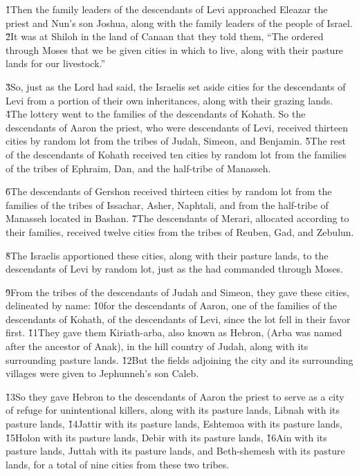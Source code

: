 \v{1}Then the family leaders of the descendants of Levi approached Eleazar the priest and Nun's son Joshua, along with the family leaders of the people of Israel. \v{2}It was at Shiloh in the land of Canaan that they told them, ``The  ordered through Moses that we be given cities in which to live, along with their pasture lands for our livestock.''

\v{3}So, just as the Lord had said, the Israelis set aside cities for the descendants of Levi from a portion of their own inheritances, along with their grazing lands. \v{4}The lottery went to the families of the descendants of Kohath. So the descendants of Aaron the priest, who were descendants of Levi, received thirteen cities by random lot from the tribes of Judah, Simeon, and Benjamin. \v{5}The rest of the descendants of Kohath received ten cities by random lot from the families of the tribes of Ephraim, Dan, and the half-tribe of Manasseh.

\v{6}The descendants of Gershon received thirteen cities by random lot from the families of the tribes of Issachar, Asher, Naphtali, and from the half-tribe of Manasseh located in Bashan. \v{7}The descendants of Merari, allocated according to their families, received twelve cities from the tribes of Reuben, Gad, and Zebulun.

\v{8}The Israelis apportioned these cities, along with their pasture lands, to the descendants of Levi by random lot, just as the  had commanded through Moses.

\v{9}From the tribes of the descendants of Judah and Simeon, they gave these cities, delineated by name: \v{10}for the descendants of Aaron, one of the families of the descendants of Kohath, of the descendants of Levi, since the lot fell in their favor first. \v{11}They gave them Kiriath-arba, also known as Hebron, (Arba was named after the ancestor of Anak), in the hill country of Judah, along with its surrounding pasture lands. \v{12}But the fields adjoining the city and its surrounding villages were given to Jephunneh's son Caleb.

\v{13}So they gave Hebron to the descendants of Aaron the priest to serve as a city of refuge for unintentional killers, along with its pasture lands, Libnah with its pasture lands, \v{14}Jattir with its pasture lands, Eshtemoa with its pasture lands, \v{15}Holon with its pasture lands, Debir with its pasture lands, \v{16}Ain with its pasture lands, Juttah with its pasture lands, and Beth-shemesh with its pasture lands, for a total of nine cities from these two tribes.

